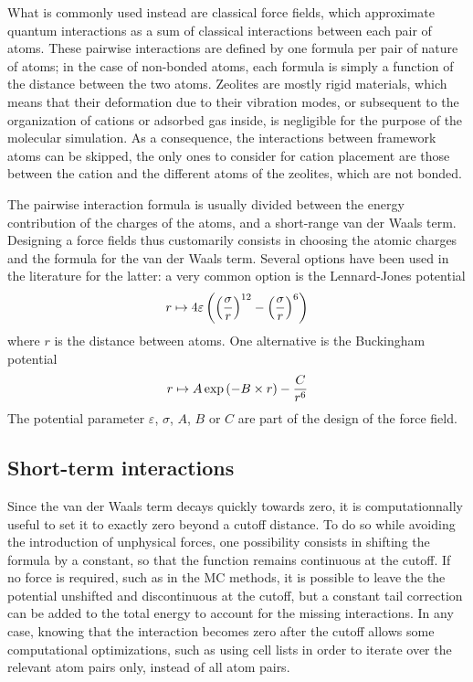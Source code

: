 \documentclass[main.tex]{subfiles}
\begin{document}
What is commonly used instead are classical force fields, which approximate quantum interactions as a sum of classical interactions between each pair of atoms. These pairwise interactions are defined by one formula per pair of nature of atoms; in the case of non-bonded atoms, each formula is simply a function of the distance between the two atoms. Zeolites are mostly rigid materials, which means that their deformation due to their vibration modes, or subsequent to the organization of cations or adsorbed gas inside, is negligible for the purpose of the molecular simulation. As a consequence, the interactions between framework atoms can be skipped, the only ones to consider for cation placement are those between the cation and the different atoms of the zeolites, which are not bonded.

The pairwise interaction formula is usually divided between the energy contribution of the charges of the atoms, and a short-range van der Waals term. Designing a force fields thus customarily consists in choosing the atomic charges and the formula for the van der Waals term. Several options have been used in the literature for the latter: a very common option is the Lennard-Jones potential
\[r\mapsto 4\varepsilon\left(\left(\frac \sigma r\right)^{12} - \left(\frac \sigma r\right)^6\right)\]
where $r$ is the distance between atoms. One alternative is the Buckingham potential
\[r\mapsto A\exp\left(-B\times r\right) - \frac C{r^6}\]
The potential parameter $\varepsilon$, $\sigma$, $A$, $B$ or $C$ are part of the design of the force field.

\subsection{Short-term interactions}

Since the van der Waals term decays quickly towards zero, it is computationnally useful to set it to exactly zero beyond a cutoff distance. To do so while avoiding the introduction of unphysical forces, one possibility consists in shifting the formula by a constant, so that the function remains continuous at the cutoff. If no force is required, such as in the MC methods, it is possible to leave the the potential unshifted and discontinuous at the cutoff, but a constant tail correction can be added to the total energy to account for the missing interactions. In any case, knowing that the interaction becomes zero after the cutoff allows some computational optimizations, such as using cell lists in order to iterate over the relevant atom pairs only, instead of all atom pairs.
\end{document}
